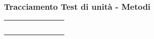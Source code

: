 
\subsubsection{Tracciamento Test di unità - Metodi}

\begin{tabularx}{\textwidth}{cX}
	
	\rowcolor{greySWEight}
	
	\rowcolor{greySWEight}
	\textcolor{white}{\textbf{Test}} & 
	\textcolor{white}{\textbf{Metodi}} \\
	

\end{tabularx}
